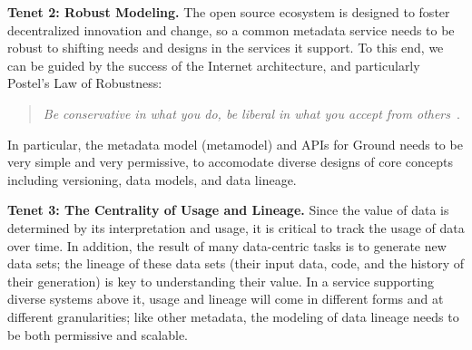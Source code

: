 \documentclass[10pt,letterpaper]{article}
\begin{document}

\vspace{0.5em}\noindent
\textbf{Tenet 2: Robust Modeling.}  The open source ecosystem is designed to foster decentralized innovation and change, so a common metadata service needs to be robust to shifting needs and designs in the services it support. To this end, we can be guided by the success of the Internet architecture, and particularly Postel's Law of Robustness:
\begin{quote}
\emph{Be conservative in what you do, be liberal in what you accept from others}~\cite{postel}.
\end{quote}
In particular, the metadata model (metamodel) and APIs for Ground needs to be very simple and very permissive, to accomodate diverse designs of core concepts including versioning, data models, and data lineage.

\vspace{0.5em}\noindent
\textbf{Tenet 3: The Centrality of Usage and Lineage.}  Since the value of data is determined by its interpretation and usage, it is critical to track the usage of data over time.  In addition, the result of many data-centric tasks is to generate new data sets; the lineage of these data sets (their input data, code, and the history of their generation) is key to understanding their value. In a service supporting diverse systems above it, usage and lineage will come in different forms and at different granularities; like other metadata, the modeling of data lineage needs to be both permissive and scalable.
\end{document}
